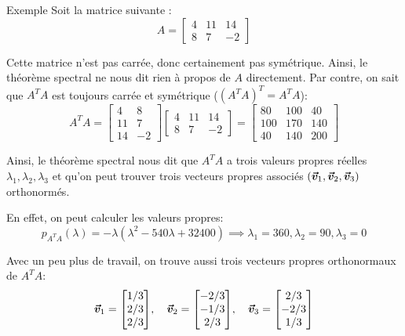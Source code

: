 \documentclass[a4paper]{article}
\begin{document}
\begin{parag}{Exemple}
    Soit la matrice suivante :
    \[A = \begin{bmatrix} 4 & 11 & 14 \\ 8 & 7 & -2 \end{bmatrix} \]

Cette matrice n'est pas carrée, donc certainement pas symétrique. Ainsi, le théorème spectral ne nous dit rien à propos de $A$ directement. Par contre, on sait que $A^T A$ est toujours carrée et symétrique ($\left(A^T A\right)^T = A^T A$):
    \[A^T A = \begin{bmatrix} 4 & 8 \\ 11 & 7 \\ 14 & -2 \end{bmatrix} \begin{bmatrix} 4 & 11 & 14 \\ 8 & 7 & -2 \end{bmatrix} = \begin{bmatrix} 80 & 100 & 40 \\ 100 & 170 & 140 \\ 40 & 140 & 200 \end{bmatrix} \]

    Ainsi, le théorème spectral nous dit que $A^T A$ a trois valeurs propres réelles $\lambda_1, \lambda_2, \lambda_3$ et qu'on peut trouver trois vecteurs propres associés $\left(\bvec{v}_1, \bvec{v}_2, \bvec{v}_3\right)$ orthonormés.

    En effet, on peut calculer les valeurs propres:
    \[p_{A^T A} \left(\lambda\right) = -\lambda\left(\lambda^2 - 540\lambda + 32400\right) \implies \lambda_1 = 360, \lambda_2 = 90, \lambda_3 = 0\]

    Avec un peu plus de travail, on trouve aussi trois vecteurs propres orthonormaux de $A^T A$:
    \[\bvec{v}_1 = \begin{bmatrix} 1 / 3 \\ 2 / 3 \\ 2 / 3 \end{bmatrix}, \mathspace \bvec{v}_2 = \begin{bmatrix} -2 / 3 \\ -1 / 3 \\ 2 / 3 \end{bmatrix}, \mathspace \bvec{v}_3 = \begin{bmatrix} 2 / 3 \\ -2 / 3 \\ 1 / 3 \end{bmatrix} \]


\end{parag}
\end{document}
